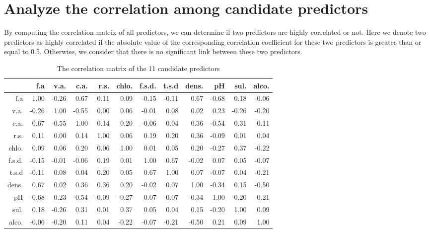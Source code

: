 \documentclass[11pt, oneside]{article}   	%
\begin{document}
\section{Analyze the correlation among candidate predictors}
By computing the correlation matrix of all predictors, we can determine if two predictors are highly correlated or not. Here we denote two predictors as highly correlated if the absolute value of the corresponding correlation coefficient for these two predictors is greater than or equal to 0.5. Otherwise, we consider that there is no significant link between these two predictors.
\begin{table}[!ht]
\centering
\begin{tabular}{rrrrrrrrrrrr}
  \hline
 & f.a & v.a. & c.a. & r.s. & chlo. & f.s.d. & t.s.d & dens. & pH & sul. & alco. \\ 
  \hline
f.a & 1.00 & -0.26 & 0.67 & 0.11 & 0.09 & -0.15 & -0.11 & 0.67 & -0.68 & 0.18 & -0.06 \\ 
  v.a. & -0.26 & 1.00 & -0.55 & 0.00 & 0.06 & -0.01 & 0.08 & 0.02 & 0.23 & -0.26 & -0.20 \\ 
  c.a. & 0.67 & -0.55 & 1.00 & 0.14 & 0.20 & -0.06 & 0.04 & 0.36 & -0.54 & 0.31 & 0.11 \\ 
  r.s. & 0.11 & 0.00 & 0.14 & 1.00 & 0.06 & 0.19 & 0.20 & 0.36 & -0.09 & 0.01 & 0.04 \\ 
  chlo. & 0.09 & 0.06 & 0.20 & 0.06 & 1.00 & 0.01 & 0.05 & 0.20 & -0.27 & 0.37 & -0.22 \\ 
  f.s.d. & -0.15 & -0.01 & -0.06 & 0.19 & 0.01 & 1.00 & 0.67 & -0.02 & 0.07 & 0.05 & -0.07 \\ 
  t.s.d & -0.11 & 0.08 & 0.04 & 0.20 & 0.05 & 0.67 & 1.00 & 0.07 & -0.07 & 0.04 & -0.21 \\ 
  dens. & 0.67 & 0.02 & 0.36 & 0.36 & 0.20 & -0.02 & 0.07 & 1.00 & -0.34 & 0.15 & -0.50 \\ 
  pH & -0.68 & 0.23 & -0.54 & -0.09 & -0.27 & 0.07 & -0.07 & -0.34 & 1.00 & -0.20 & 0.21 \\ 
  sul. & 0.18 & -0.26 & 0.31 & 0.01 & 0.37 & 0.05 & 0.04 & 0.15 & -0.20 & 1.00 & 0.09 \\ 
  alco. & -0.06 & -0.20 & 0.11 & 0.04 & -0.22 & -0.07 & -0.21 & -0.50 & 0.21 & 0.09 & 1.00 \\ 
   \hline
\end{tabular}
\caption{The correlation matrix of the 11 candidate predictors}
\end{table}
\end{document}
